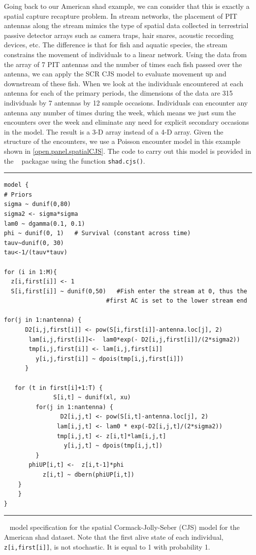 Going back to our American shad example, we can consider that this is
exactly a spatial capture recapture problem.  In stream networks, the
placement of PIT antennas along the stream mimics the type of spatial
data collected in terrestrial passive detector arrays such as camera
traps, hair snares, acoustic recording devices, etc.  The difference
is that for fish and aquatic species, the stream constrains the
movement of individuals to a linear network.  Using the data from the
array of 7 PIT antennas and the number of times each fish passed over
the antenna, we can apply the SCR CJS model to evaluate movement up
and downstream of these fish.  When we look at the individuals
encountered at each antenna for each of the primary periods, the
dimensions of the data are 315 individuals by 7 antennas by 12 sample
occasions. Individuals can encounter any antenna any number of times
during the week, which means we just sum the encounters over the week
and eliminate any need for explicit secondary occasions in the
model. The result is a 3-D array instead of a 4-D array.  Given the
structure of the encounters, we use a Poisson encounter model in this
example shown in \ref{open.panel.spatialCJS}.  The code to carry out
this model is provided in the \scrbook~ packagae using the function
\verb+shad.cjs()+.


\begin{panel}[htp]
\centering
\rule[0.1in]{\textwidth}{.03in}
{\small
\begin{verbatim}
model {
# Priors
sigma ~ dunif(0,80)
sigma2 <- sigma*sigma
lam0 ~ dgamma(0.1, 0.1)
phi ~ dunif(0, 1)   # Survival (constant across time)
tauv~dunif(0, 30)
tau<-1/(tauv*tauv)

for (i in 1:M){
  z[i,first[i]] <- 1
  S[i,first[i]] ~ dunif(0,50)   #Fish enter the stream at 0, thus the
			                 #first AC is set to the lower stream end

for(j in 1:nantenna) {
	  D2[i,j,first[i]] <- pow(S[i,first[i]]-antenna.loc[j], 2)
       lam[i,j,first[i]]<-  lam0*exp(- D2[i,j,first[i]]/(2*sigma2))
       tmp[i,j,first[i]] <- lam[i,j,first[i]]
         y[i,j,first[i]] ~ dpois(tmp[i,j,first[i]])
      }

   for (t in first[i]+1:T) {
	          S[i,t] ~ dunif(xl, xu) 
         for(j in 1:nantenna) {
		        D2[i,j,t] <- pow(S[i,t]-antenna.loc[j], 2)
               lam[i,j,t] <- lam0 * exp(-D2[i,j,t]/(2*sigma2))
	           tmp[i,j,t] <- z[i,t]*lam[i,j,t]
		         y[i,j,t] ~ dpois(tmp[i,j,t])
		 }
 	   phiUP[i,t] <-  z[i,t-1]*phi
	       z[i,t] ~ dbern(phiUP[i,t])
	}
	}
}
\end{verbatim}
}
\rule[-0.1in]{\textwidth}{.03in}
\caption{
\jags~ model specification for the spatial
Cormack-Jolly-Seber (CJS) model for the American shad dataset. Note that the first alive state of
each individual, \mbox{\tt z[i,first[i]]}, is not stochastic. It is
equal to 1 with probability 1.}
\label{open.panel.spatialCJS}
\end{panel}





